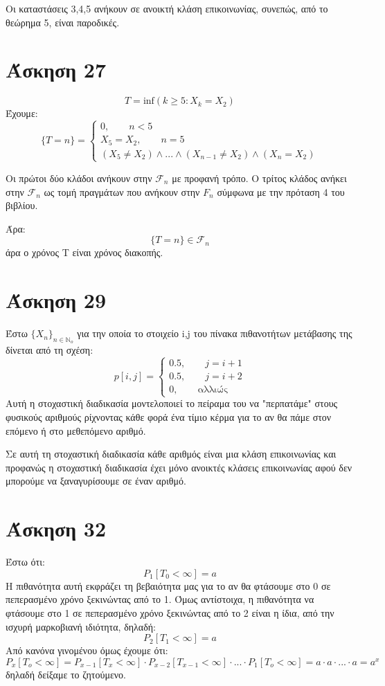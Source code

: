 \documentclass[a4paper,oneside, 11pt]{article}
\begin{document}
Οι καταστάσεις 3,4,5 ανήκουν σε ανοικτή κλάση επικοινωνίας, συνεπώς, από το θεώρημα 5, είναι παροδικές.


\section*{Άσκηση 27}
$$
T = \mathrm{inf}(k \geq 5: X_k = X_2)
$$
Έχουμε:
$$
\{ T = n \} = \begin{cases}
0, \qquad n<5 \\
X_5 = X_2, \qquad n = 5 \\
(X_5 \neq X_2) \wedge ... \wedge (X_{n-1} \neq X_2) \wedge (X_n = X_2)
\end{cases}
$$
\bigbreak 

Οι πρώτοι δύο κλάδοι ανήκουν στην $\mathcal F_n$ με προφανή τρόπο. Ο τρίτος κλάδος ανήκει στην $\mathcal F_n$ ως τομή πραγμάτων που ανήκουν στην $F_n$ σύμφωνα με την πρόταση 4 του βιβλίου. \bigbreak 

Άρα:
$$
\{ T = n \} \in \mathcal F_n
$$
άρα ο χρόνος T είναι χρόνος διακοπής.

\section*{Άσκηση 29}
Έστω $\{X_n\}_{n \in \mathbb N_o}$ για την οποία το στοιχείο i,j του πίνακα πιθανοτήτων μετάβασης της δίνεται από τη σχέση:
$$
p[i,j] =  \begin{cases}
0.5, \qquad j=i+1 \\ 0.5, \qquad j=i+2 \\ 
0, \qquad \textrm{αλλιώς}
\end{cases}
$$
Αυτή η στοχαστική διαδικασία μοντελοποιεί το πείραμα του να "περπατάμε" στους φυσικούς αριθμούς ρίχνοντας κάθε φορά ένα τίμιο κέρμα για το αν θα πάμε στον επόμενο ή στο μεθεπόμενο αριθμό. \bigbreak 

Σε αυτή τη στοχαστική διαδικασία κάθε αριθμός είναι μια κλάση επικοινωνίας και προφανώς η στοχαστική διαδικασία έχει μόνο ανοικτές κλάσεις επικοινωνίας αφού δεν μπορούμε να ξαναγυρίσουμε σε έναν αριθμό.


\section*{Άσκηση 32}
Έστω ότι:
$$
P_1[T_0 < \infty] =  a
$$
Η πιθανότητα αυτή εκφράζει τη βεβαιότητα μας για το αν θα φτάσουμε στο 0 σε πεπερασμένο χρόνο ξεκινώντας από το 1.
Όμως αντίστοιχα, η πιθανότητα να φτάσουμε στο 1 σε πεπερασμένο χρόνο ξεκινώντας από το 2 είναι η ίδια, από την ισχυρή μαρκοβιανή ιδιότητα, δηλαδή:
$$
P_2[T_1 < \infty] = a
$$
Από κανόνα γινομένου όμως έχουμε ότι:
$$
P_x[T_o < \infty] = P_{x-1}[T_x < \infty] \cdot P_{x-2}[T_{x-1} < \infty] \cdot ... \cdot P_1[T_o<\infty] = a \cdot a \cdot ... \cdot a = a^x
$$
δηλαδή δείξαμε το ζητούμενο.
\end{document}
